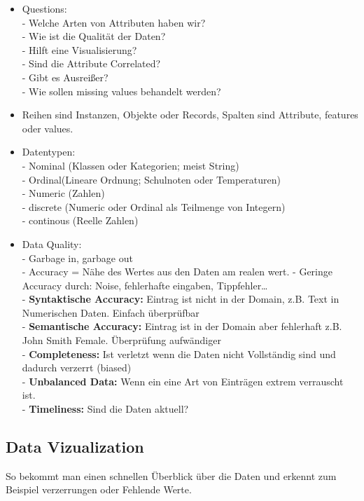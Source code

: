 \documentclass[a4paper]{scrartcl}
\begin{document}
\begin{itemize}
\item Questions:\\
- Welche Arten von Attributen haben wir?\\
- Wie ist die Qualität der Daten?\\
- Hilft eine Visualisierung?\\
- Sind die Attribute Correlated?\\
- Gibt es Ausreißer?\\
- Wie sollen missing values behandelt werden?\\
\item Reihen sind Instanzen, Objekte oder Records, Spalten sind Attribute, features oder values.
\item Datentypen:\\
- Nominal (Klassen oder Kategorien; meist String)\\
- Ordinal(Lineare Ordnung; Schulnoten oder Temperaturen)\\
- Numeric (Zahlen)\\
- discrete (Numeric oder Ordinal als Teilmenge von Integern)\\
- continous (Reelle Zahlen)\\
\item Data Quality:\\
- Garbage in, garbage out\\
- Accuracy = Nähe des Wertes aus den Daten am realen wert.
- Geringe Accuracy durch: Noise, fehlerhafte eingaben, Tippfehler\dots\\
- \textbf{Syntaktische Accuracy:} Eintrag ist nicht in der Domain, z.B. Text in Numerischen Daten. Einfach überprüfbar\\
- \textbf{Semantische Accuracy:} Eintrag ist in der Domain aber fehlerhaft z.B. John Smith Female. Überprüfung aufwändiger\\
- \textbf{Completeness:} Ist verletzt wenn die Daten nicht Vollständig sind und dadurch verzerrt (biased)\\
- \textbf{Unbalanced Data:} Wenn ein eine Art von Einträgen extrem verrauscht ist.\\
- \textbf{Timeliness:} Sind die Daten aktuell?\\
\end{itemize}

\subsection{Data Vizualization}
So bekommt man einen schnellen Überblick über die Daten und erkennt zum Beispiel verzerrungen oder Fehlende Werte.\\
\end{document}
